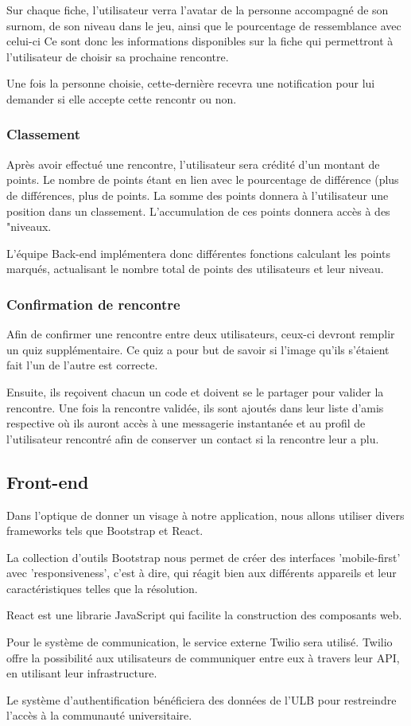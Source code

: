 \documentclass[10pt]{article}
\begin{document}
    Sur chaque fiche, l'utilisateur verra l'avatar de la personne accompagné de son surnom, de son niveau dans le jeu, ainsi que le 
    pourcentage de ressemblance avec celui-ci  
    Ce sont donc les informations disponibles sur la fiche qui permettront à l'utilisateur de choisir sa prochaine rencontre.

    Une fois la personne choisie, cette-dernière recevra une notification pour lui demander si elle accepte cette rencontr ou non.
   \subsubsection{Classement}
    Après avoir effectué une rencontre, l'utilisateur sera crédité d'un montant de points. Le nombre de points étant en lien avec le
    pourcentage de différence (plus de différences, plus de points. La somme des points donnera à l'utilisateur une position dans 
    un classement. L'accumulation de ces points donnera accès à des "niveaux.

    L'équipe Back-end implémentera donc différentes fonctions calculant les points marqués, actualisant le nombre total de points des
    utilisateurs et leur niveau.
   \subsubsection{Confirmation de rencontre}
    Afin de confirmer une rencontre entre deux utilisateurs, ceux-ci devront remplir un quiz supplémentaire. 
    Ce quiz a pour but de savoir si l'image qu'ils s'étaient fait l'un de l'autre est correcte. 

    Ensuite, ils reçoivent chacun un code et doivent se le partager pour valider la rencontre. 
    Une fois la rencontre validée, ils sont ajoutés dans leur liste d'amis respective où ils auront accès à une messagerie 
    instantanée et au profil de l'utilisateur rencontré afin de conserver un contact si la rencontre leur a plu. 
  \subsection{Front-end}
   Dans l'optique de donner un visage à notre application, nous allons utiliser divers frameworks tels que Bootstrap et React.

   La collection d'outils Bootstrap nous permet de créer des interfaces 'mobile-first' avec 'responsiveness', c'est à dire, qui réagit bien
   aux différents appareils et leur caractéristiques telles que la résolution.

   React est une librarie JavaScript qui facilite la construction des composants web.

   Pour le système de communication, le service externe Twilio sera utilisé. Twilio offre la possibilité aux utilisateurs de communiquer
   entre eux à travers leur API, en utilisant leur infrastructure.

   Le système d'authentification bénéficiera des données de l'ULB pour restreindre l'accès à la communauté universitaire. 
\end{document}
